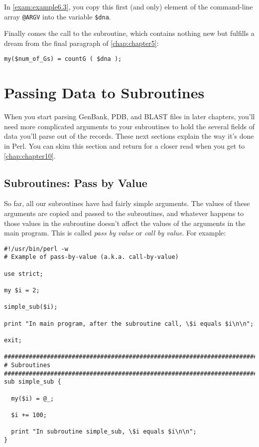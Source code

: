In \autoref{exam:example6.3}, you copy this first (and only) element of the command-line array \verb|@ARGV| into the variable \verb|$dna|.

Finally comes the call to the subroutine, which contains nothing new but fulfills a dream from the final paragraph of \autoref{chap:chapter5}:

\begin{lstlisting}
my($num_of_Gs) = countG ( $dna );
\end{lstlisting}

\section{Passing Data to Subroutines}
When you start parsing GenBank, PDB, and BLAST files in later chapters, you'll need more complicated arguments to your subroutines to hold the several fields of data you'll parse out of the records. These next sections explain the way it's done in Perl. You can skim this section and return for a closer read when you get to \autoref{chap:chapter10}. 

\subsection{Subroutines: Pass by Value}
So far, all our subroutines have had fairly simple arguments. The values of these arguments are copied and passed to the subroutines, and whatever happens to those values in the subroutine doesn't affect the values of the arguments in the main program. This is called \textit{pass by value} or \textit{call by value}. For example: 

\begin{lstlisting}
#!/usr/bin/perl -w
# Example of pass-by-value (a.k.a. call-by-value)

use strict;

my $i = 2;

simple_sub($i);

print "In main program, after the subroutine call, \$i equals $i\n\n";

exit;

################################################################################
# Subroutines
################################################################################
sub simple_sub {

  my($i) = @_;

  $i += 100;

  print "In subroutine simple_sub, \$i equals $i\n\n";
}
\end{lstlisting}


